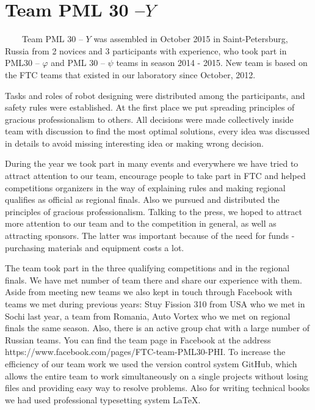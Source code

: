 
\section{Team PML 30 --${Y}$} 
	
	
        Team PML 30 -- ${Y}$ was assembled in October 2015 in Saint-Petersburg, Russia from 2 novices and 3 participants with experience, who took part in PML30 -- ${\varphi}$ and PML 30 -- ${\psi}$ teams in season 2014 - 2015. New team is based on the FTC teams that existed in our laboratory since October, 2012. 
	
	Tasks and roles of robot designing were distributed among the participants, and safety rules were established. At the first place we put spreading principles of gracious professionalism to others. All decisions were made collectively inside team with discussion to find the most optimal solutions, every idea was discussed in details to avoid missing interesting idea or making wrong decision. 
	
	During the year we took part in many events and everywhere we have tried to attract attention to our team, encourage people to take part in FTC and helped competitions organizers in the way of explaining rules and making regional qualifies as official as regional finals. Also we pursued and distributed the principles of gracious professionalism. Talking to the press, we hoped to attract more attention to our team and to the competition in general, as well as attracting sponsors. The latter was important because of the need for funds - purchasing materials and equipment costs a lot.
	
	The team took part in the three qualifying competitions and in the regional finals. We have met number of team there and share our experience with them. Aside from meeting new teams we also kept in touch through Facebook with teams we met during previous years: Stuy Fission 310 from USA who we met in Sochi last year, a team from Romania, Auto Vortex who we met on regional finals the same season. Also, there is an active group chat with a large number of Russian teams. You can find the team page in Facebook at the address https://www.facebook.com/pages/FTC-team-PML30-PHI.
	To increase the efficiency of our team work we used the version control system GitHub, which allows the entire team to work simultaneously on a single projects without losing files and providing easy way to resolve problems. Also for writing technical books we had used professional typesetting system LaTeX.
	
